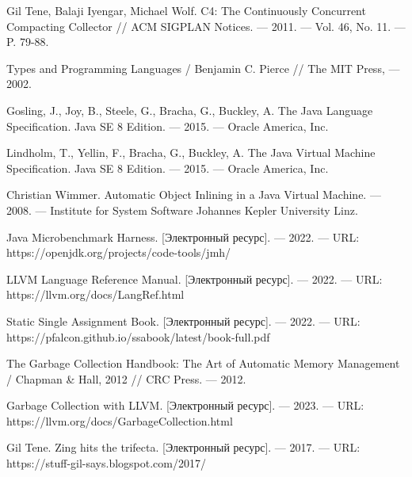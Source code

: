 \begingroup 
\renewcommand{\section}[2]{\anonsection{СПИСОК ИСПОЛЬЗОВАННЫХ ИСТОЧНИКОВ И ЛИТЕРАТУРЫ}}
\begin{flushleft}
\begin{thebibliography}{}

Gil Tene, Balaji Iyengar, Michael Wolf. C4: The Continuously Concurrent Compacting Collector
  // ACM SIGPLAN Notices. --- 2011. --- Vol. 46, No. 11. --- P. 79-88.

Types and Programming Languages / Benjamin C. Pierce // The MIT Press, --- 2002.

Gosling, J., Joy, B., Steele, G., Bracha, G., Buckley, A. The Java Language
Specification. Java SE 8 Edition. --- 2015. --- Oracle America, Inc.

Lindholm, T., Yellin, F., Bracha, G., Buckley, A. The Java Virtual Machine
Specification. Java SE 8 Edition. --- 2015. --- Oracle America, Inc.
	
Christian Wimmer. Automatic Object Inlining in a Java Virtual Machine. --- 2008. --- Institute for System Software
Johannes Kepler University Linz.

Java Microbenchmark Harness. [Электронный ресурс]. --- 2022. --- URL: https://openjdk.org/projects/code-tools/jmh/
	
LLVM Language Reference Manual. [Электронный ресурс]. --- 2022. --- URL: https://llvm.org/docs/LangRef.html
	
Static Single Assignment Book. [Электронный ресурс]. --- 2022. --- URL: https://pfalcon.github.io/ssabook/latest/book-full.pdf
	
The Garbage Collection Handbook: The Art of Automatic Memory Management / Chapman \& Hall, 2012 // CRC Press. --- 2012.
	
Garbage Collection with LLVM. [Электронный ресурс]. --- 2023. --- URL: https://llvm.org/docs/GarbageCollection.html
	
Gil Tene. Zing hits the trifecta. [Электронный ресурс]. --- 2017. --- URL: https://stuff-gil-says.blogspot.com/2017/


\end{thebibliography}
\end{flushleft}
